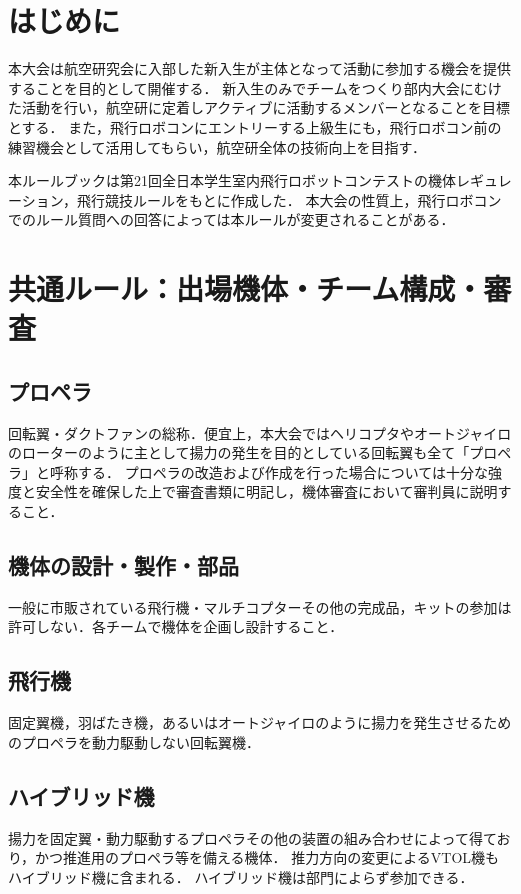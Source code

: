 \documentclass[a4paper,12pt,oneside]{jsarticle}
\begin{document}

\newpage
\tableofcontents
\newpage

\section{はじめに}
本大会は航空研究会に入部した新入生が主体となって活動に参加する機会を提供することを目的として開催する．
新入生のみでチームをつくり部内大会にむけた活動を行い，航空研に定着しアクティブに活動するメンバーとなることを目標とする．
また，飛行ロボコンにエントリーする上級生にも，飛行ロボコン前の練習機会として活用してもらい，航空研全体の技術向上を目指す．

本ルールブックは第21回全日本学生室内飛行ロボットコンテストの機体レギュレーション，飛行競技ルールをもとに作成した．
本大会の性質上，飛行ロボコンでのルール質問への回答によっては本ルールが変更されることがある．

\section{共通ルール：出場機体・チーム構成・審査}
\subsection{プロペラ}
回転翼・ダクトファンの総称．便宜上，本大会ではヘリコプタやオートジャイロのローターのように主として揚力の発生を目的としている回転翼も全て「プロペラ」と呼称する．
プロペラの改造および作成を行った場合については十分な強度と安全性を確保した上で審査書類に明記し，機体審査において審判員に説明すること．

\subsection{機体の設計・製作・部品}
一般に市販されている飛行機・マルチコプターその他の完成品，キットの参加は許可しない．各チームで機体を企画し設計すること．

\subsection{飛行機}
固定翼機，羽ばたき機，あるいはオートジャイロのように揚力を発生させるためのプロペラを動力駆動しない回転翼機．
\subsection{ハイブリッド機}
揚力を固定翼・動力駆動するプロペラその他の装置の組み合わせによって得ており，かつ推進用のプロペラ等を備える機体．
推力方向の変更によるVTOL機もハイブリッド機に含まれる．
ハイブリッド機は部門によらず参加できる．
\end{document}
